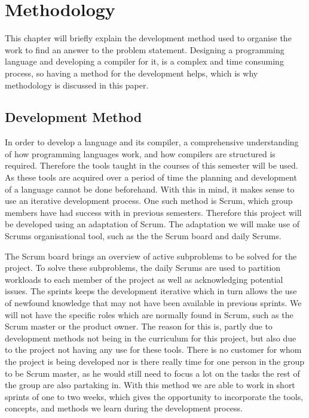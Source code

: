 \chapter{Methodology}\label{cha:methdology}   

This chapter will briefly explain the development method used to organise the work to find an answer to the problem statement. 
Designing a programming language and developing a compiler for it, is a complex and time consuming process, so having a method for the development helps, which is why methodology is discussed in this paper.

\section{Development Method}
In order to develop a language and its compiler, a comprehensive understanding of how programming languages work, and how compilers are structured is required.
Therefore the tools taught in the courses of this semester will be used.
As these tools are acquired over a period of time the planning and development of a language cannot be done beforehand.
With this in mind, it makes sense to use an iterative development process.
One such method is Scrum, which group members have had success with in previous semesters.
Therefore this project will be developed using an adaptation of Scrum.
The adaptation we will make use of Scrums organisational tool, such as the the Scrum board and daily Scrums.

The Scrum board brings an overview of active subproblems to be solved for the project.
To solve these subproblems, the daily Scrums are used to partition workloads to each member of the project as well as acknowledging potential issues.
The sprints keeps the development iterative which in turn allows the use of newfound knowledge that may not have been available in previous sprints.
We will not have the specific roles which are normally found in Scrum, such as the Scrum master or the product owner. \citep{Scrum}
The reason for this is, partly due to development methods not being in the curriculum for this project, but also due to the project not having any use for these tools.
There is no customer for whom the project is being developed nor is there really time for one person in the group to be Scrum master, as he would still need to focus a lot on the tasks the rest of the group are also partaking in.
With this method we are able to work in short sprints of one to two weeks, which gives the opportunity to incorporate the tools, concepts, and methods we learn during the development process.

